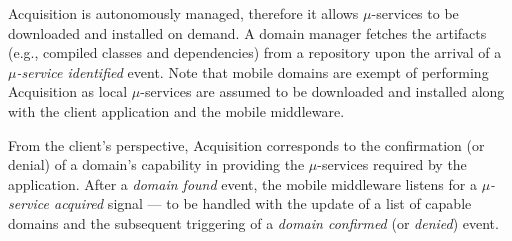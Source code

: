 Acquisition is autonomously managed, therefore it allows $\mu$-services to be downloaded 
and installed on demand. A domain manager fetches the artifacts (e.g., compiled classes and dependencies) from a repository upon the arrival of a \textit{$\mu$-service identified} event. Note that mobile domains are exempt of performing Acquisition as local $\mu$-services are assumed to be downloaded and installed along with the client application and the mobile middleware. 


%
%	
%	
%	


From the client's perspective, Acquisition corresponds to the confirmation (or denial) of a domain's capability in providing the $\mu$-services required by the application. After a \textit{domain found} event, the mobile middleware listens for a \textit{$\mu$-service acquired} signal --- to be handled with the update of a list of capable domains and the subsequent triggering of a \textit{domain confirmed} (or \textit{denied}) event.

